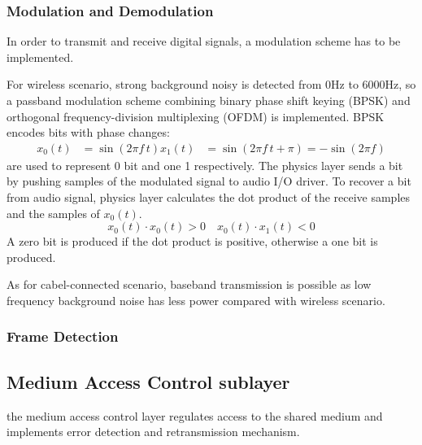 \subsubsection{Modulation and Demodulation}
In order to transmit and receive digital signals, a modulation scheme has to be implemented.
\par
For wireless scenario, strong background noisy is detected from 0Hz to 6000Hz,
so a passband modulation scheme
combining binary phase shift keying (BPSK) and orthogonal frequency-division multiplexing (OFDM)
is implemented.
BPSK encodes bits with phase changes:
\begin{align*}
	x_0(t) & =\sin(2\pi f\, t)
	x_1(t) & =\sin(2\pi f\, t + \pi) = -\sin(2\pi f)
\end{align*}
are used to represent 0 bit and one 1 respectively.
The physics layer sends a bit by pushing samples of the modulated signal to audio I/O driver.
To recover a bit from audio signal, physics layer calculates the dot product of the receive samples and the samples of $x_0(t)$.
\[
	x_0(t)\cdot x_0(t) > 0
	\quad
	x_0(t)\cdot x_1(t) < 0
\]
A zero bit is produced if the dot product is positive, otherwise a one bit is produced.

As for cabel-connected scenario, baseband transmission is possible as low frequency background noise has less power compared with wireless scenario.



\subsubsection{Frame Detection}

\subsection{Medium Access Control sublayer}
the medium access control layer regulates access to the shared medium and implements error detection and retransmission mechanism.
